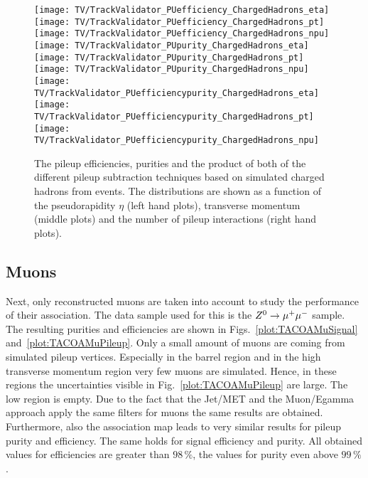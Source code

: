 \begin{figure}[Ht]
    \centering
    \texttt{[image: TV/TrackValidator\_PUefficiency\_ChargedHadrons\_eta]}
    \texttt{[image: TV/TrackValidator\_PUefficiency\_ChargedHadrons\_pt]}
    \texttt{[image: TV/TrackValidator\_PUefficiency\_ChargedHadrons\_npu]}
    \\
    \texttt{[image: TV/TrackValidator\_PUpurity\_ChargedHadrons\_eta]}
    \texttt{[image: TV/TrackValidator\_PUpurity\_ChargedHadrons\_pt]}
    \texttt{[image: TV/TrackValidator\_PUpurity\_ChargedHadrons\_npu]}
    \\
    \texttt{[image: TV/TrackValidator\_PUefficiencypurity\_ChargedHadrons\_eta]}
    \texttt{[image: TV/TrackValidator\_PUefficiencypurity\_ChargedHadrons\_pt]}
    \texttt{[image: TV/TrackValidator\_PUefficiencypurity\_ChargedHadrons\_npu]}
    \caption[Pileup efficiencies, purities and their product of the different pileup subtraction techniques based on simulated charged hadrons from \ttbar events]{The pileup efficiencies, purities and the product of both of the different pileup subtraction techniques based on simulated charged hadrons from \ttbar events. The distributions are shown as a function of the pseudorapidity $\eta$ (left hand plots), transverse momentum (middle plots) and the number of pileup interactions (right hand plots). \label{plot:TACOACHPileup}}
\end{figure}



\subsection{Muons \label{sec:TASEFRDAM}}

Next, only reconstructed muons are taken into account to study the performance of their association. The data sample used  for this is the ${Z^{0}}\rightarrow\mu^+\mu^-$ sample. The resulting purities and efficiencies are shown in Figs.~\ref{plot:TACOAMuSignal} and~\ref{plot:TACOAMuPileup}. Only a small amount of muons are coming from simulated pileup vertices. Especially in the barrel region and in the high transverse momentum region very few muons are simulated. Hence, in these regions the uncertainties visible in Fig.~\ref{plot:TACOAMuPileup} are large. The low \pt region is empty. Due to the fact that the Jet/MET and the Muon/Egamma approach apply the same filters for muons the same results are obtained. Furthermore, also the association map leads to very similar results for pileup purity and efficiency. The same holds for signal efficiency and purity. All obtained values for efficiencies are greater than $98\,\%$, the values for purity even above $99\,\%$.

